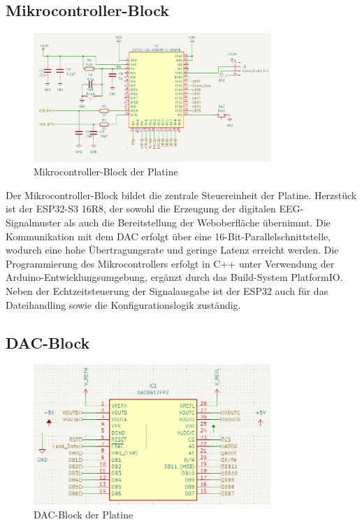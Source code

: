 \subsection{Mikrocontroller-Block}
\begin{figure}[H]
    \centering
    \includegraphics[width=0.8\textwidth]{bilder/Mikrocontroller_Block.png}
    \caption{Mikrocontroller-Block der Platine}
    \label{fig:mikrocontroller_block}
\end{figure}

Der Mikrocontroller-Block bildet die zentrale Steuereinheit der Platine. Herzstück ist der ESP32-S3 16R8, der sowohl die Erzeugung der digitalen EEG-Signalmuster als auch die Bereitstellung der Weboberfläche übernimmt. Die Kommunikation mit dem DAC erfolgt über eine 16-Bit-Parallelschnittstelle, wodurch eine hohe Übertragungsrate und geringe Latenz erreicht werden.
Die Programmierung des Mikrocontrollers erfolgt in C++ unter Verwendung der Arduino-Entwicklungsumgebung, ergänzt durch das Build-System PlatformIO. Neben der Echtzeitsteuerung der Signalausgabe ist der ESP32 auch für das Dateihandling sowie die Konfigurationslogik zuständig.

\subsection{DAC-Block}
\begin{figure}[H]
    \centering
    \includegraphics[width=0.8\textwidth]{bilder/DAC.png}
    \caption{DAC-Block der Platine}
    \label{fig:dac_block}
\end{figure}

